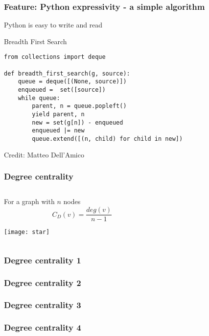 \documentclass[xcolor=dvipsnames, 9pt]{beamer}
\begin{document}
\begin{frame}[fragile]
\frametitle{Feature: Python expressivity - a simple algorithm}
Python is easy to write and read
\begin{block}{Breadth First Search}
\begin{lstlisting}
from collections import deque

def breadth_first_search(g, source):
    queue = deque([(None, source)])
    enqueued =  set([source])
    while queue:
        parent, n = queue.popleft()
        yield parent, n
        new = set(g[n]) - enqueued
        enqueued |= new
        queue.extend([(n, child) for child in new])
\end{lstlisting}
\end{block}
Credit: Matteo Dell'Amico
\end{frame}

\begin{frame}
\frametitle{Degree centrality}
\begin{columns}
\begin{column}{0.5\textwidth}
For a graph with $n$ nodes
\begin{equation*}
C_D(v) = \frac{deg(v)}{n-1}
\end{equation*}
\centerline{\texttt{[image: star]}}
\end{column}
\begin{column}{0.5\textwidth}


\end{column}
\end{columns}
\end{frame}

\begin{frame}
\frametitle{Degree centrality 1}

\end{frame}

\begin{frame}
\frametitle{Degree centrality 2}

\end{frame}

\begin{frame}
\frametitle{Degree centrality 3}

\end{frame}

\begin{frame}
\frametitle{Degree centrality 4}

\end{frame}
\end{document}
